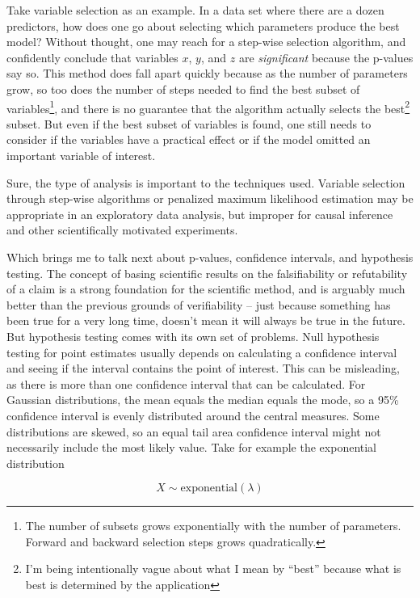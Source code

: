 \documentclass[11pt, oneside, openany]{scrbook}
\begin{document}
Take variable selection as an example. In a data set where there are a dozen predictors, how does one go about selecting which parameters produce the best model? Without thought, one may reach for a step-wise selection algorithm, and confidently conclude that variables \(x\), \(y\), and \(z\) are \emph{significant} because the p-values say so. This method does fall apart quickly because as the number of parameters grow, so too does the number of steps needed to find the best subset of variables\footnote{The number of subsets grows exponentially with the number of parameters. Forward and backward selection steps grows quadratically.}, and there is no guarantee that the algorithm actually selects the best\footnote{I'm being intentionally vague about what I mean by ``best'' because what is best is determined by the application} subset. But even if the best subset of variables is found, one still needs to consider if the variables have a practical effect or if the model omitted an important variable of interest.

Sure, the type of analysis is important to the techniques used. Variable selection through step-wise algorithms or penalized maximum likelihood estimation \citep{hoerl1970ridge, tibshirani1996regression} may be appropriate in an exploratory data analysis, but improper for causal inference and other scientifically motivated experiments.

Which brings me to talk next about p-values, confidence intervals, and hypothesis testing. The concept of basing scientific results on the falsifiability \citep{popper1959logic} or refutability of a claim is a strong foundation for the scientific method, and is arguably much better than the previous grounds of verifiability -- just because something has been true for a very long time, doesn't mean it will always be true in the future. But hypothesis testing comes with its own set of problems. Null hypothesis testing for point estimates usually depends on calculating a confidence interval and seeing if the interval contains the point of interest. This can be misleading, as there is more than one confidence interval that can be calculated. For Gaussian distributions, the mean equals the median equals the mode, so a 95\% confidence interval is evenly distributed around the central measures. Some distributions are skewed, so an equal tail area confidence interval might not necessarily include the most likely value. Take for example the exponential distribution

\[
X \sim \mathrm{exponential} (\lambda)
\]
\end{document}
